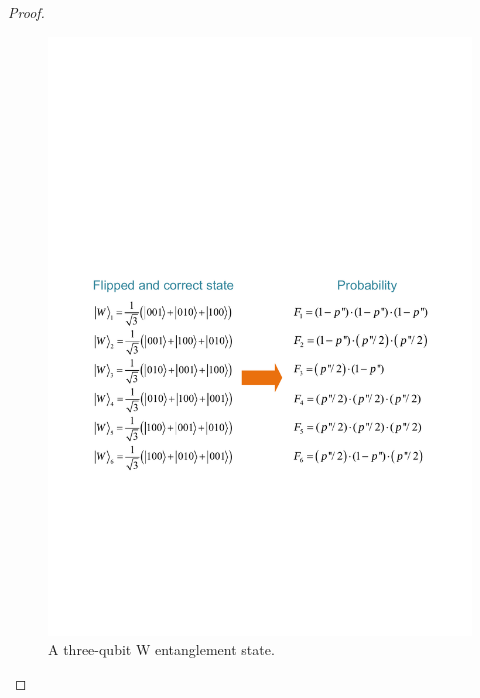 \documentclass[conference]{IEEEtran}
\begin{document}
\begin{appendices}
\begin{proof}
\begin{figure}[h]
	\centering
	\includegraphics[width=0.9\linewidth]{images/three-qubit-entanglement.pdf}
	\caption{A three-qubit W entanglement state.}
	\label{three-qubit-entanglement}
\end{figure}


\end{proof}
\end{appendices}
\end{document}
